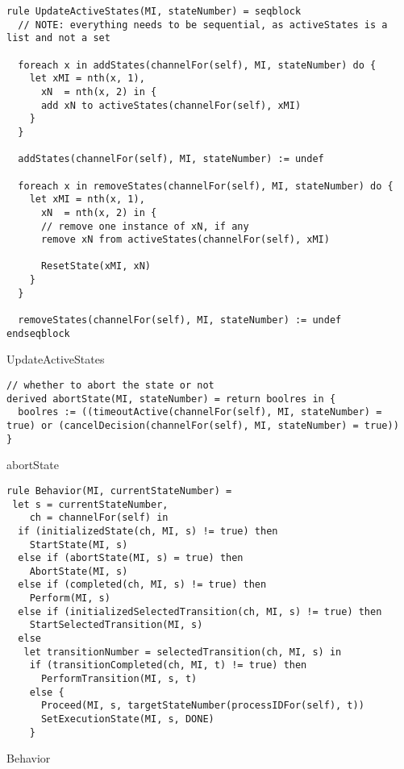\begin{listing}[H]
\begin{verbatim}
rule UpdateActiveStates(MI, stateNumber) = seqblock
  // NOTE: everything needs to be sequential, as activeStates is a list and not a set

  foreach x in addStates(channelFor(self), MI, stateNumber) do {
    let xMI = nth(x, 1),
      xN  = nth(x, 2) in {
      add xN to activeStates(channelFor(self), xMI)
    }
  }

  addStates(channelFor(self), MI, stateNumber) := undef

  foreach x in removeStates(channelFor(self), MI, stateNumber) do {
    let xMI = nth(x, 1),
      xN  = nth(x, 2) in {
      // remove one instance of xN, if any
      remove xN from activeStates(channelFor(self), xMI)

      ResetState(xMI, xN)
    }
  }

  removeStates(channelFor(self), MI, stateNumber) := undef
endseqblock
\end{verbatim}
\caption{UpdateActiveStates}
\label{lst:asm:UpdateActiveStates}
\end{listing}




\begin{listing}[H]
\begin{verbatim}
// whether to abort the state or not
derived abortState(MI, stateNumber) = return boolres in {
  boolres := ((timeoutActive(channelFor(self), MI, stateNumber) = true) or (cancelDecision(channelFor(self), MI, stateNumber) = true))
}
\end{verbatim}
\caption{abortState}
\label{lst:asm:abortState}
\end{listing}




\begin{listing}[H]
\begin{verbatim}
rule Behavior(MI, currentStateNumber) =
 let s = currentStateNumber,
    ch = channelFor(self) in
  if (initializedState(ch, MI, s) != true) then
    StartState(MI, s)
  else if (abortState(MI, s) = true) then
    AbortState(MI, s)
  else if (completed(ch, MI, s) != true) then
    Perform(MI, s)
  else if (initializedSelectedTransition(ch, MI, s) != true) then
    StartSelectedTransition(MI, s)
  else
   let transitionNumber = selectedTransition(ch, MI, s) in
    if (transitionCompleted(ch, MI, t) != true) then
      PerformTransition(MI, s, t)
    else {
      Proceed(MI, s, targetStateNumber(processIDFor(self), t))
      SetExecutionState(MI, s, DONE)
    }
\end{verbatim}
\caption{Behavior}
\label{lst:asm:Behavior}
\end{listing}




